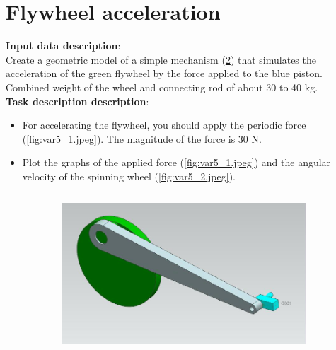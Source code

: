 \documentclass[12pt]{article}
\newcommand\ttask[3] 
 {
	\section*{#1}
	\textbf{Input data description}: \\ #2 \  \\
	\textbf{Task description description}: #3
	\newpage
 }
\begin{document}
\ttask{Flywheel acceleration}{
	Create a geometric model of a simple mechanism (\cref{fig:var5_0.jpeg}) that simulates the acceleration of the green flywheel by the force applied to the blue piston. Combined weight of the wheel and connecting rod of about 30 to 40 kg.
}{
	\begin{itemize}
		\item For accelerating the flywheel, you should apply the periodic force (\cref{fig:var5_1.jpeg}). The magnitude of the force is 30 N.
		\item Plot the graphs of the applied force (\cref{fig:var5_1.jpeg}) and the angular velocity of the spinning wheel (\cref{fig:var5_2.jpeg}).
	\end{itemize}

	\begin{figure}[H]
		\begin{subfigure}{0.6\textwidth}
			\centering\includegraphics[height=6cm,width=1\textwidth,keepaspectratio]{var5_0.jpeg}
			\caption{}
			\label{fig:var5_0.jpeg}
		\end{subfigure}


\end{figure}}
\end{document}
